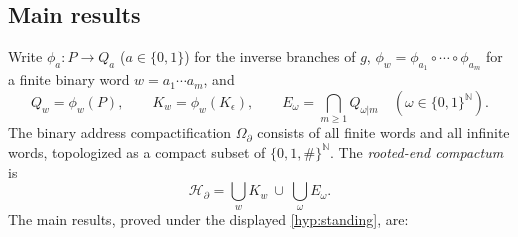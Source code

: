 \documentclass[11pt,reqno]{amsart}
\numberwithin{equation}{section}
\theoremstyle{plain}
\theoremstyle{definition}
\theoremstyle{remark}
\newcommand{\N}{\mathbb N}
\newcommand{\OmB}{\Omega_\partial}
\newcommand{\HB}{\mathcal H_\partial}
\newcommand{\rootK}{K_{\epsilon}}
\begin{document}
\subsection{Main results}

Write $\phi_a\colon P\to Q_a$ ($a\in\{0,1\}$) for the inverse branches of
$g$, $\phi_w=\phi_{a_1}\circ\cdots\circ\phi_{a_m}$ for a finite binary
word $w=a_1\cdots a_m$, and
\[
 Q_w=\phi_w(P),\qquad
 K_w=\phi_w(\rootK),\qquad
 E_\omega=\bigcap_{m\ge1}Q_{\omega|m}
 \quad(\omega\in\{0,1\}^{\N}).
\]
The binary address compactification $\OmB$ consists of all finite words
and all infinite words, topologized as a compact subset of
$\{0,1,\#\}^{\N}$.  The \emph{rooted-end compactum} is
\[
 \HB
 =
 \bigcup_{w}K_w\ \cup\ \bigcup_{\omega}E_\omega .
\]
The main results, proved under the displayed \cref{hyp:standing}, are:
\end{document}
